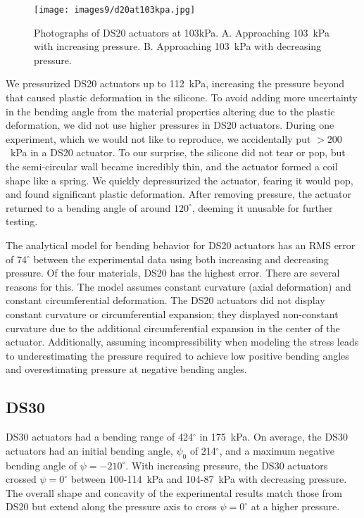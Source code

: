 \begin{figure}[ht]
    \centering
     \texttt{[image: images9/d20at103kpa.jpg]}
    \caption{Photographs of DS20 actuators at 103kPa. A. Approaching 103~kPa with increasing pressure. B. Approaching 103~kPa with decreasing pressure.}
    \label{fig:d20at103kpa}
\end{figure}

We pressurized DS20 actuators up to 112~kPa, increasing the pressure beyond that caused plastic deformation in the silicone. To avoid adding more uncertainty in the bending angle from the material properties altering due to the plastic deformation, we did not use higher pressures in DS20 actuators. During one experiment, which we would not like to reproduce, we accidentally put $>200$~kPa in a DS20 actuator. To our surprise, the silicone did not tear or pop, but the semi-circular wall became incredibly thin, and the actuator formed a coil shape like a spring. We quickly depressurized the actuator, fearing it would pop, and found significant plastic deformation. After removing pressure, the actuator returned to a bending angle of around $120^\circ$, deeming it unusable for further testing. 

The analytical model for bending behavior for DS20 actuators has an RMS error of 74$^\circ$ between the experimental data using both increasing and decreasing pressure. Of the four materials, DS20 has the highest error. There are several reasons for this. The model assumes constant curvature (axial deformation) and constant circumferential deformation. The DS20 actuators did not display constant curvature or circumferential expansion; they displayed non-constant curvature due to the additional circumferential expansion in the center of the actuator. Additionally, assuming incompressibility when modeling the stress leads to underestimating the pressure required to achieve low positive bending angles and overestimating pressure at negative bending angles. 

\clearpage
\subsection{DS30}

DS30 actuators had a bending range of 424$^\circ$ in 175~kPa. On average, the DS30 actuators had an initial bending angle, $\psi_0$ of 214$^\circ$, and a maximum negative bending angle of $\psi=-210^\circ$. With increasing pressure, the DS30 actuators crossed $\psi=0^\circ$ between 100-114~kPa and 104-87~kPa with decreasing pressure. The overall shape and concavity of the experimental results match those from DS20 but extend along the pressure axis to cross $\psi=0^\circ$ at a higher pressure. 

